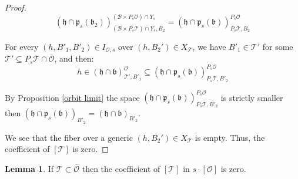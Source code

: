 \documentclass[12pt]{article}
\newcommand{\B}{\mathcal{B}}
\newcommand{\s}{\mathcal{O}}
\theoremstyle{plain}
\theoremstyle{definition}
\newtheorem{lemma}[theorem]{Lemma}
\begin{document}
\begin{proof}
    $$ (\mathfrak{h}\cap\mathfrak{p}_{s}(\mathfrak{b_{2}}))^{(\B \times P_{s} \mathcal{O})\cap Y_{s}}_{(\B \times P_{s}\mathcal{T})\cap Y_{s},B_{2}}=(\mathfrak{h}\cap\mathfrak{p}_{s}(\mathfrak{b}))^{P_{s} \mathcal{O}}_{ P_{s}\mathcal{T},B_{2}}$$

    
    For every $(h,B'_{1},B'_{2})\in I_{\s,s}$ over $(h,B_{2}')\in X_{\mathcal{T}}$, we have $B'_{1}\in \mathcal{T}'$ for some $\mathcal{T}' \subseteq P_{s}\mathcal{T} \cap \overline{\mathcal{O}}$, and then: 
    $$h\in (\mathfrak{h}\cap \mathfrak{b})^{\mathcal{O}}_{ \mathcal{T}',B'_{1}}\subseteq(\mathfrak{h}\cap \mathfrak{p}_{s}(\mathfrak{b}))^{P_{s}\mathcal{O}}_{ P_{s}\mathcal{T}, B'_{2}}$$

    
    By Proposition \ref{orbit limit} the space $(\mathfrak{h}\cap \mathfrak{p}_{s}(\mathfrak{b}))^{P_{s}\mathcal{O}}_{ P_{s}\mathcal{T}, B'_{2}}$ is strictly smaller then $(\mathfrak{h}\cap \mathfrak{p}_{s}(\mathfrak{b}))_{B'_{2}}=(\mathfrak{h}\cap \mathfrak{b})_{B'_{2}}$. 
    
    We see that the fiber over a generic $(h,B_2')\in X_{\mathcal{T}}$ is empty. Thus, the coefficient of $[\mathcal{T}]$ is zero.

\end{proof}

\begin{lemma}
    If $\mathcal{T}\subset \overline{\mathcal{O}}$ then the coefficient of $[\mathcal{T}]$ in ${s}\cdot [\mathcal{O}]$ is zero.
\end{lemma}
\end{document}
